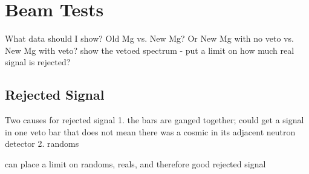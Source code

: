 \section{Beam Tests}
What data should I show?  Old Mg vs. New Mg?  Or New Mg with no veto vs.  New Mg with veto?
show the vetoed spectrum - put a limit on how much real signal is rejected?

\subsection{Rejected Signal}
Two causes for rejected signal
1. the bars are ganged together; could get a signal in one veto bar that does not mean there was a cosmic in its adjacent neutron detector
2. randoms

can place a limit on randoms, reals, and therefore good rejected signal

%
% 
% 
